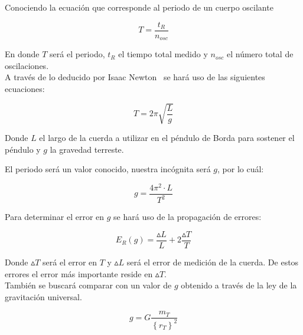 \documentclass[a4paper,twocolumn]{article}
\begin{document}
Conociendo la ecuación que corresponde al periodo de un cuerpo oscilante\cite{b2}

\begin{large}
    \begin{equation} \label{e3}
        T=\frac{t_{R}}{n_{osc}}
    \end{equation}
\end{large}

En donde $T$ será el periodo, $t_{R}$ el tiempo total medido y $n_{osc}$ el número total de oscilaciones.%
\\

A través de lo deducido por Isaac Newton~\cite{b6} se hará uso de las siguientes ecuaciones:

\begin{large}
    \begin{equation*}
        T=2 \pi \sqrt{\frac{L}{g}}
    \end{equation*}
\end{large}

Donde $L$ el largo de la cuerda a utilizar en el péndulo de Borda para sostener el péndulo y $g$ la gravedad terreste.

El periodo será un valor conocido, nuestra incógnita será $g$, por lo cuál:%

\begin{large}
    \begin{equation} \label{e1}
        g=\frac{4 \pi ^{2} \cdot L}{T^{2}}
    \end{equation}
\end{large}

Para determinar el error en $g$ se hará uso de la propagación de errores:\cite{b8}

\begin{large}
    \begin{equation} \label{e2}
        E_{R}(g)=\frac{\vartriangle L}{L}+2\frac{\vartriangle T}{T}
    \end{equation}
\end{large}

Donde $\vartriangle T$ será el error en $T$ y $\vartriangle L$ será el error de medición de la cuerda. De estos errores el error más importante reside en $\vartriangle T$.%
\\

También se buscará comparar con un valor de $g$ obtenido a través de la ley de la gravitación universal\cite{b5}.

\begin{large}
    \begin{equation} \label{e4}
        g=G\frac{m_{T}}{\left\{ r_{T} \right\} ^{2}}
    \end{equation}
\end{large}
\end{document}
